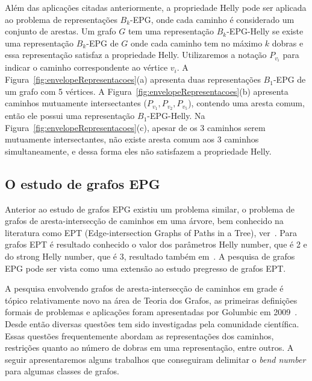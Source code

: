 Além das aplicações citadas anteriormente, a propriedade Helly pode ser aplicada ao problema de representações $ B_k$-EPG, onde cada caminho é considerado um conjunto de arestas. Um grafo $ G $ tem uma representação $ B_k$-EPG-Helly se existe uma representação $ B_k $-EPG de $G$ onde cada caminho tem no máximo $ k $ dobras e essa representação satisfaz a propriedade Helly. 
Utilizaremos a notação $P_{v_i}$ para indicar o caminho correspondente ao vértice $v_i$.
A Figura~\ref{fig:envelopeRepresentacoes}(a) apresenta duas representações  $B_1$-EPG  de um grafo com 5 vértices. A Figura~\ref{fig:envelopeRepresentacoes}(b)   apresenta caminhos mutuamente intersectantes ($P_{v_1}, P_{v_2}, P_{v_5}$), contendo uma aresta comum, então ele possui uma representação $ B_1$-EPG-Helly. Na Figura~\ref{fig:envelopeRepresentacoes}(c), apesar de os 3 caminhos serem mutuamente intersectantes, não existe aresta comum aos 3 caminhos simultaneamente, e dessa forma eles não satisfazem a propriedade Helly.





\subsection{O estudo de grafos EPG}

Anterior ao estudo de grafos EPG existiu um problema similar, o problema de grafos de aresta-intersecção de caminhos em uma árvore, bem conhecido na literatura como EPT (Edge-intersection Graphs of Paths
in a Tree), ver~\cite{golumbic2004recognition}. Para grafos EPT é resultado conhecido o valor dos parâmetros Helly number, que  é 2 e do strong Helly number, que é 3, resultado também em~\cite{golumbic2004recognition}. A pesquisa de grafos EPG pode ser vista como uma extensão ao estudo pregresso de grafos EPT.

 A pesquisa envolvendo grafos de aresta-intersecção de caminhos em grade é tópico relativamente novo na área de Teoria dos Grafos, as primeiras definições formais de problemas e aplicações foram apresentadas por Golumbic em 2009~\cite{golumbic2009}. Desde então diversas questões tem sido investigadas pela comunidade científica. Essas questões frequentemente abordam as representações dos caminhos, restrições quanto ao número de dobras em uma representação, entre outros. A seguir apresentaremos alguns trabalhos que conseguiram delimitar o \textit{bend number} para algumas classes de grafos.

